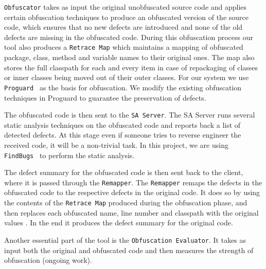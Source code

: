 \documentclass[twocolumn]{article}
\begin{document}
{\tt Obfuscator} takes as input the original unobfuscated source code and applies certain obfuscation techniques to produce an obfuscated version of the source code, which 
ensures that no new defects are introduced and none of the old defects are missing in the obfuscated code. During this obfuscation process our tool also produces a {\tt Retrace Map} which maintains a 
mapping of obfuscated package, class, method and variable names to their original ones. The map also stores the full classpath for each and every item in case of repackaging of classes 
or inner classes being moved out of their outer classes. For our system we use {\tt Proguard}~\cite{proguard} as the basis for obfuscation. We modify the existing obfuscation 
techniques in Proguard to guarantee the preservation of defects.

The obfuscated code is then sent to the {\tt SA Server}. The SA Server runs several static analysis techniques on the obfuscated code and reports back a 
list of detected defects. At this stage even if someone tries to reverse engineer the received code, it will be a non-trivial task. In this project, 
we are using {\tt FindBugs}~\cite{findbugs} to perform the static analysis.

The defect summary for the obfuscated code is then sent back to the client, where it is passed through the {\tt Remapper}. The {\tt Remapper} remaps the defects in the obfuscated code to 
the respective defects in the original code. It does so by using the contents of the {\tt Retrace Map} produced during the obfuscation phase, and then replaces each obfuscated name, line number 
and classpath with the original values . In the end it produces the defect summary for the original code.

Another essential part of the tool is the {\tt Obfuscation Evaluator}. It takes as input both the original and obfuscated code and then measures the strength of obfuscation (ongoing work).
\end{document}
